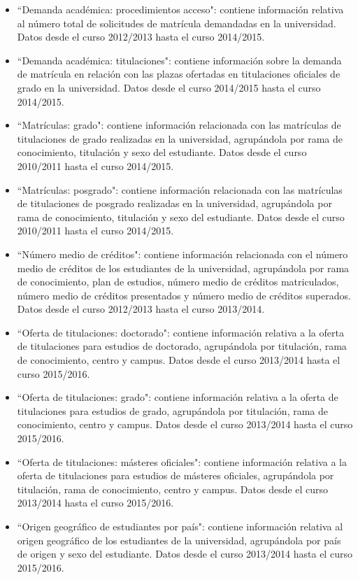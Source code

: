\begin{itemize}
	\item ``Demanda académica: procedimientos acceso": contiene información relativa al número total de solicitudes de matrícula demandadas en la universidad. Datos desde el curso 2012/2013 hasta el curso 2014/2015.
	\item ``Demanda académica: titulaciones": contiene información sobre la demanda de matrícula en relación con las plazas ofertadas en titulaciones oficiales de grado en la universidad. Datos desde el curso 2014/2015 hasta el curso 2014/2015.
	\item ``Matrículas: grado": contiene información relacionada con las matrículas de titulaciones de grado realizadas en la universidad, agrupándola por rama de conocimiento, titulación y sexo del estudiante. Datos desde el curso 2010/2011 hasta el curso 2014/2015.
	\item ``Matrículas: posgrado": contiene información relacionada con las matrículas de titulaciones de posgrado realizadas en la universidad, agrupándola por rama de conocimiento, titulación y sexo del estudiante. Datos desde el curso 2010/2011 hasta el curso 2014/2015.
	\item ``Número medio de créditos": contiene información relacionada con el número medio de créditos de los estudiantes de la universidad, agrupándola por rama de conocimiento, plan de estudios, número medio de créditos matriculados, número medio de créditos presentados y número medio de créditos superados. Datos desde el curso 2012/2013 hasta el curso 2013/2014.
	\item ``Oferta de titulaciones: doctorado": contiene información relativa a la oferta de titulaciones para estudios de doctorado, agrupándola por titulación, rama de conocimiento, centro y campus. Datos desde el curso 2013/2014 hasta el curso 2015/2016.
	\item ``Oferta de titulaciones: grado": contiene información relativa a la oferta de titulaciones para estudios de grado, agrupándola por titulación, rama de conocimiento, centro y campus. Datos desde el curso 2013/2014 hasta el curso 2015/2016.
	\item ``Oferta de titulaciones: másteres oficiales": contiene información relativa a la oferta de titulaciones para estudios de másteres oficiales, agrupándola por titulación, rama de conocimiento, centro y campus. Datos desde el curso 2013/2014 hasta el curso 2015/2016.
	\item ``Origen geográfico de estudiantes por país": contiene información relativa al origen geográfico de los estudiantes de la universidad, agrupándola por país de origen y sexo del estudiante. Datos desde el curso 2013/2014 hasta el curso 2015/2016.

\end{itemize}
